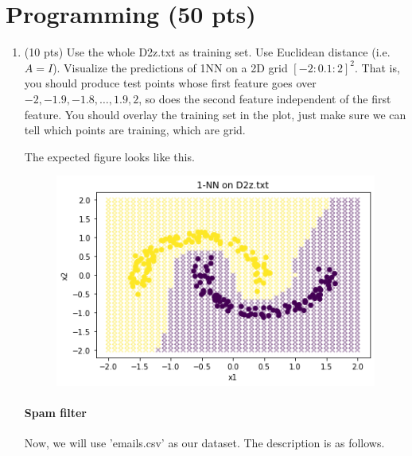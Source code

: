 \documentclass[a4paper]{article}
\theoremstyle{definition}
\begin{document}
\section{Programming (50 pts)}
\begin{enumerate}
	\item (10 pts) Use the whole D2z.txt as training set.  Use Euclidean distance (i.e. $A=I$).
	Visualize the predictions of 1NN on a 2D grid $[-2:0.1:2]^2$.
	That is, you should produce test points whose first feature goes over $-2, -1.9, -1.8, \ldots, 1.9, 2$, so does the second feature independent of the first feature.
	You should overlay the training set in the plot, just make sure we can tell which points are training, which are grid.
	
	The expected figure looks like this.
	
	\begin{figure}[h]
		\includegraphics{1nn_visualization.png}
	\end{figure}
	
	\paragraph{Spam filter} Now, we will use 'emails.csv' as our dataset. The description is as follows.
	

\end{enumerate}
\end{document}
